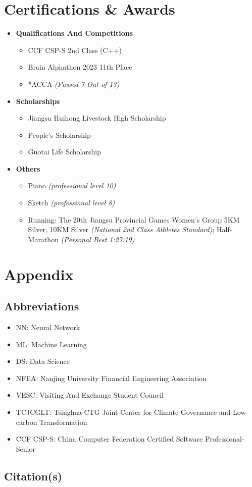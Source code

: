 \documentclass[a4paper]{article}
\begin{document}
\section{Certifications \& Awards}
\begin{itemize}
    \item \textbf{Qualifications And Competitions}
    \begin{itemize}
        \item CCF CSP-S 2nd Class (C++)
        \item Brain Alphathon 2023 11th Place
        \item *ACCA \textit{(Passed 7 Out of 13) }
    \end{itemize}
    
    \item \textbf{Scholarships}
    \begin{itemize}
        \item Jiangsu Huihong Livestock High Scholarship
        \item People's Scholarship 
        \item Guotai Life Scholarship
    \end{itemize}

    \item \textbf{Others}
    \begin{itemize}
        \item Piano \textit{(professional level 10)} 
        \item Sketch \textit{(professional level 8)}
        \item Running: The 20th Jiangsu Provincial Games Women's Group 5KM Silver, 10KM Silver \textit{(National 2nd Class Athletes Standard)}; Half-Marathon \textit{(Personal Best 1:27:19)} 
    \end{itemize}
    
\end{itemize}

\section{Appendix}

\subsection{Abbreviations}
\begin{itemize}
    \item NN: Neural Network 
    \item ML: Machine Learning
    \item DS: Data Science
    \item NFEA: Nanjing University Financial Engineering Association
    \item VESC: Visiting And Exchange Student Council
    \item TCJCGLT: Tsinghua-CTG Joint Center for Climate Governance and Low-carbon Transformation
    \item CCF CSP-S: China Computer Federation Certified Software Professional-Senior
\end{itemize}

\subsection{Citation(s)}
\printbibliography[heading=none]
\end{document}
